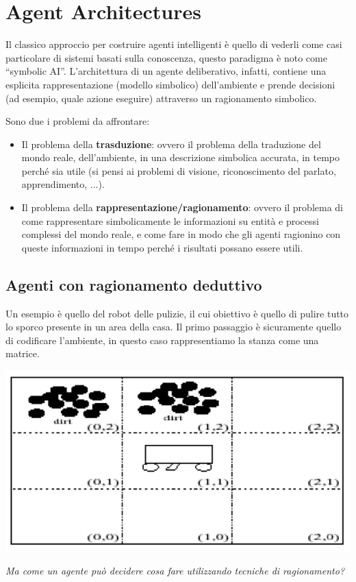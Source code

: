 \newpage

\section{Agent Architectures}
Il classico approccio per costruire agenti intelligenti è quello di vederli come casi particolare di sistemi basati sulla conoscenza, questo paradigma è noto come “symbolic AI”. 
L'architettura di un agente deliberativo, infatti, contiene una esplicita rappresentazione (modello simbolico) dell’ambiente e prende decisioni (ad esempio, quale azione eseguire) attraverso un ragionamento simbolico.

Sono due i problemi da affrontare:
\begin{itemize}
    \item Il problema della \textbf{trasduzione}: ovvero il problema della traduzione del mondo reale, dell’ambiente, in una descrizione simbolica accurata, in tempo perché sia utile (si pensi ai problemi di visione, riconoscimento del parlato, apprendimento, ...).
    \item Il problema della \textbf{rappresentazione/ragionamento}: ovvero il problema di come rappresentare simbolicamente le informazioni su entità e processi complessi del mondo reale, e come fare in modo che gli agenti ragionino con queste informazioni in tempo perché i risultati possano essere utili.
\end{itemize} 

\subsection{Agenti con ragionamento deduttivo}
Un esempio è quello del robot delle pulizie, il cui obiettivo è quello di pulire tutto lo sporco presente in un area della casa. Il primo passaggio è sicuramente quello di codificare l'ambiente, in questo caso rappresentiamo la stanza come una matrice.
\begin{center}
    \includegraphics[scale=0.4]{images/vacuum world.PNG}
\end{center}
\textit{Ma come un agente può decidere cosa fare utilizzando tecniche di ragionamento?}

